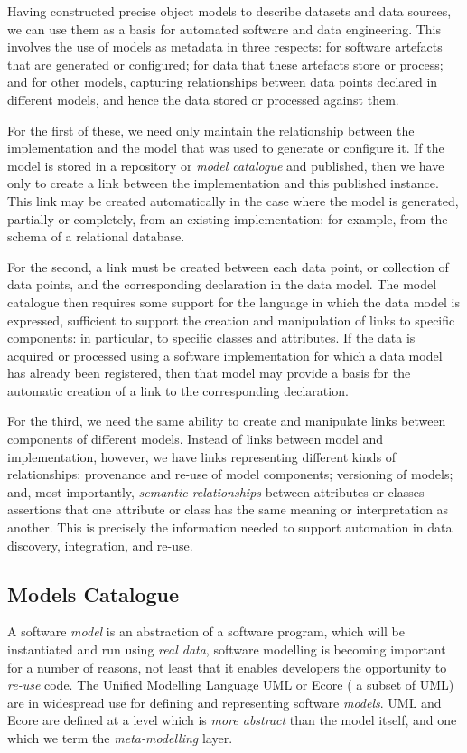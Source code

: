 Having constructed precise object models to describe datasets and data
sources, we can use them as a basis for automated software and data
engineering.  This involves the use of models as metadata in three
respects: for software artefacts that are generated or configured; for
data that these artefacts store or process; and for other models,
capturing relationships between data points declared in different
models, and hence the data stored or processed against them.

For the first of these, we need only maintain the relationship between
the implementation and the model that was used to generate or
configure it.  If the model is stored in a repository or \emph{model
  catalogue} and published, then we have only to create a link between
the implementation and this published instance.  This link may be
created automatically in the case where the model is generated,
partially or completely, from an existing implementation: for example,
from the schema of a relational database.

For the second, a link must be created between each data point, or
collection of data points, and the corresponding declaration in the
data model.  The model catalogue then requires some support for the
language in which the data model is expressed, sufficient to support
the creation and manipulation of links to specific components: in
particular, to specific classes and attributes.  If the data is
acquired or processed using a software implementation for which a data
model has already been registered, then that model may provide a basis
for the automatic creation of a link to the corresponding declaration.

For the third, we need the same ability to create and manipulate links
between components of different models.  Instead of links between
model and implementation, however, we have links representing
different kinds of relationships: provenance and re-use of model
components; versioning of models; and, most importantly,
\emph{semantic relationships} between attributes or
classes---assertions that one attribute or class has the same meaning
or interpretation as another.  This is precisely the information
needed to support automation in data discovery, integration, and
re-use.

\subsection{Models Catalogue}

A software \emph{model} is an abstraction of a software program, which
will be instantiated and run using \emph{real data}, software
modelling is becoming important for a number of reasons, not least
that it enables developers the opportunity to \emph{re-use} code. The
Unified Modelling Language UML \cite{UML} or Ecore \cite{ECORE} ( a
subset of UML) are in widespread use for defining and representing
software \emph{models}. UML and Ecore are defined at a level which is
\emph{more abstract} than the model itself, and one which we term the
\emph{meta-modelling} layer.

